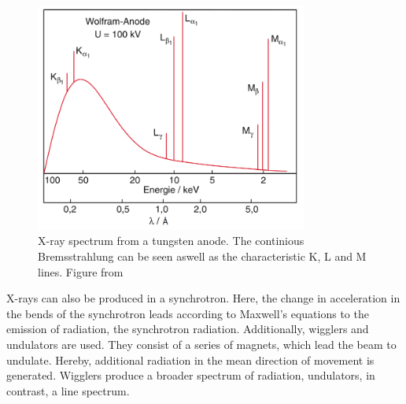 \begin{figure}[ht]
    \centering
    \includegraphics[width = 0.8\textwidth]{Bilder/Grundlagen/xraySpectrum.png}
    \caption{X-ray spectrum from a tungsten anode. The continious Bremsstrahlung can be seen aswell as the characteristic K, L and M lines. Figure from \cite{Demtroeder.2016}}
    \label{fig:xRaySpectrum}
\end{figure}

X-rays can also be produced in a synchrotron. Here, the change in acceleration in the bends of the synchrotron leads according to Maxwell's equations to the emission of radiation, the synchrotron radiation. Additionally, wigglers and undulators are used. They consist of a series of magnets, which lead the beam to undulate. Hereby, additional radiation in the mean direction of movement is generated. Wigglers produce a broader spectrum of radiation, undulators, in contrast, a line spectrum.



